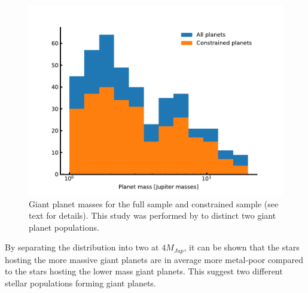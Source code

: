 \begin{figure}[htpb!]
    \centering
    \includegraphics[width=1.0\linewidth]{figures/giantPopulation.pdf}
    \caption{Giant planet masses for the full sample and constrained sample (see text for details).
             This study was performed by \citet{Santos2017} to distinct two giant planet populations.}
    \label{fig:giantpopulations}
\end{figure}

By separating the distribution into two at $4M_{Jup}$, it can be shown \citep[see][for
details]{Santos2017} that the stars hosting the more massive giant planets are in average more
metal-poor compared to the stars hosting the lower mass giant planets. This suggest two different
stellar populations forming giant planets.
